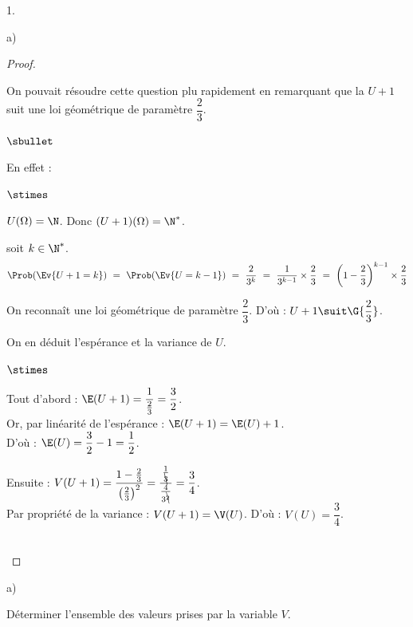\begin{noliste}{1.}
\begin{noliste}{a)}
\begin{proof}
      \begin{remark}
        On pouvait résoudre cette question plu rapidement en remarquant
        que la \var $U+1$ suit une loi géométrique de paramètre
        $\dfrac{2}{3}$.
        \begin{noliste}{$\sbullet$}
	  \item En effet :
	  \begin{noliste}{$\stimes$}
	    \item $U(\Omega)=\N$. Donc $(U+1)(\Omega)
	    =\N^*$.
	    \item soit $k\in \N^*$.
	    \[
	      \Prob(\Ev{U+1=k}) \ = \ \Prob(\Ev{U=k-1}) \ = \
	      \dfrac{2}{3^k} \ = \ \dfrac{1}{3^{k-1}} \times 
	      \dfrac{2}{3} \ = \ \left(1-\dfrac{2}{3}\right)^{k-1}
	      \times \dfrac{2}{3}
	    \]
	  \end{noliste}
	  On reconnaît une loi géométrique de paramètre 
	    $\dfrac{2}{3}$.
	    D'où : $U+1 \suit \G{\dfrac{2}{3}}$.
	  
	  \item On en déduit l'espérance et la variance de $U$.
	  \begin{noliste}{$\stimes$}
	    \item Tout d'abord : $\E(U+1) = \dfrac{1}{\frac{2}{3}}
	    =\dfrac{3}{2}$.\\
	    Or, par linéarité de l'espérance : $\E(U+1)=\E(U)+1$.\\
	    D'où : $\E(U) = \dfrac{3}{2}-1 = \dfrac{1}{2}$.
	    
	    \item Ensuite : $V(U+1) = \dfrac{1-\frac{2}{3}}
	    {\big(\frac{2}{3}\big)^2} = \dfrac{\frac{1}{\bcancel{3}}}
	    {\frac{4}{3^{\bcancel{2}}}} = \dfrac{3}{4}$.\\
	    Par propriété de la variance : $V(U+1)=\V(U)$. D'où :
	    $V(U)=\dfrac{3}{4}$.
	  \end{noliste}
        \end{noliste}
      \end{remark}~\\[-1.4cm]
    \end{proof}
  \end{noliste}
  
  
  \newpage
  
  
  \item 
  \begin{noliste}{a)}
    \setlength{\itemsep}{2mm}
    \item Déterminer l'ensemble des valeurs prises par la variable $V$.
    

\end{noliste}
\end{noliste}
